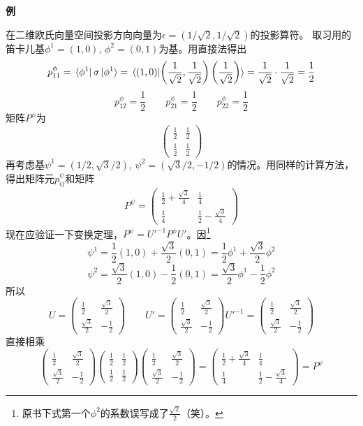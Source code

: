 \textbf{例}

在二维欧氏向量空间投影方向向量为$\epsilon=(1/\sqrt{2},1/\sqrt{2})$的投影算符。
取习用的笛卡儿基$\phi^1=(1,0)$, $\phi^2=(0,1)$为基。用直接法得出
\[p_{11}^{\phi}=\bra*{\phi^1}\sigma\ket*{\phi^1}=\bra*{(1,0)}\ket*{\left(\frac{1}{\sqrt{2}},\frac{1}{\sqrt{2}}\right)\left(\frac{1}{\sqrt{2}}\right)}=\frac{1}{\sqrt{2}} \cdot \frac{1}{\sqrt{2}}=\frac{1}{2}\]
\[p_{12}^{\phi}=\frac{1}{2} \qquad p_{21}^{\phi}=\frac{1}{2} \qquad p_{22}^{\phi}=\frac{1}{2}\]
矩阵$P^{\phi}$为
\[
\begin{pmatrix}
    \frac{1}{2} & \frac{1}{2} \\ \frac{1}{2} & \frac{1}{2}
\end{pmatrix}    
\]
再考虑基$\psi^1=(1/2,\sqrt{3}/2)$, $\psi^2=(\sqrt{3}/2,-1/2)$的情况。用同样的计算方法，得出矩阵元$p_{ij}^{\psi}$和矩阵
\[P^{\psi}=
\begin{pmatrix}
    \frac{1}{2}+\frac{\sqrt{3}}{4} & \frac{1}{4} \\
    \frac{1}{4} & \frac{1}{2}-\frac{\sqrt{3}}{4}
\end{pmatrix}
\]
现在应验证一下变换定理，$P^{\psi}=U'^{-1}P^{\phi}U'$。因\footnote{原书下式第一个$\phi^2$的系数误写成了$\frac{\sqrt{2}}{2}$（笑）。}
\[\psi^1=\frac{1}{2}(1,0)+\frac{\sqrt{3}}{2}(0,1)=\frac{1}{2}\phi^1+\frac{\sqrt{3}}{2}\phi^2\]
\[\psi^2=\frac{\sqrt{3}}{2}(1,0)-\frac{1}{2}(0,1)=\frac{\sqrt{3}}{2}\phi^1-\frac{1}{2}\phi^2\]
所以
\[
U=
\begin{pmatrix}
    \frac{1}{2} & \frac{\sqrt{3}}{2} \\
    \frac{\sqrt{3}}{2} & -\frac{1}{2}
\end{pmatrix}
\qquad
U'=
\begin{pmatrix}
    \frac{1}{2} & \frac{\sqrt{3}}{2} \\
    \frac{\sqrt{3}}{2} & -\frac{1}{2}
\end{pmatrix}
U'^{-1}=
\begin{pmatrix}
    \frac{1}{2} & \frac{\sqrt{3}}{2} \\
    \frac{\sqrt{3}}{2} & -\frac{1}{2}
\end{pmatrix}
\]
直接相乘
\[
\begin{pmatrix}
    \frac{1}{2} & \frac{\sqrt{3}}{2} \\
    \frac{\sqrt{3}}{2} & -\frac{1}{2}
\end{pmatrix}   
\begin{pmatrix}
    \frac{1}{2} & \frac{1}{2} \\
    \frac{1}{2} & \frac{1}{2}
\end{pmatrix}
\begin{pmatrix}
    \frac{1}{2} & \frac{\sqrt{3}}{2} \\
    \frac{\sqrt{3}}{2} & -\frac{1}{2}
\end{pmatrix}
=
\begin{pmatrix}
    \frac{1}{2}+\frac{\sqrt{3}}{4} & \frac{1}{4} \\
    \frac{1}{4} & \frac{1}{2}-\frac{\sqrt{3}}{4}
\end{pmatrix}
=P^{\psi}
\]
